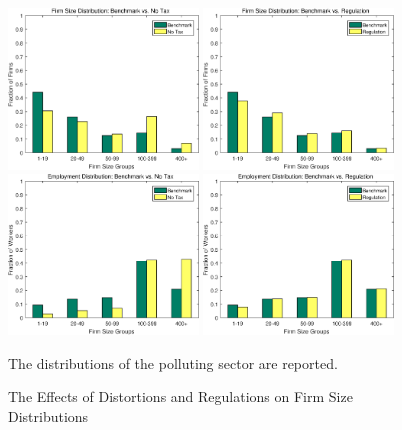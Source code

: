 \documentclass[AEJ]{AEA}
\begin{document}
\begin{figure}[t]
    \begin{center}
    \includegraphics[width=0.45\textwidth]{./Figures/bench_notax_fs.eps}
    \includegraphics[width=0.45\textwidth]{./Figures/bench_reg_fs.eps} \\
    \includegraphics[width=0.45\textwidth]{./Figures/bench_notax_es.eps}
    \includegraphics[width=0.45\textwidth]{./Figures/bench_reg_es.eps}
    \caption{The Effects of Distortions and Regulations on Firm Size Distributions}
    \begin{figurenotes}
        The distributions of the polluting sector are reported.
    \end{figurenotes}
    \label{fig:compare_size}
    \end{center}
\end{figure}
\end{document}

